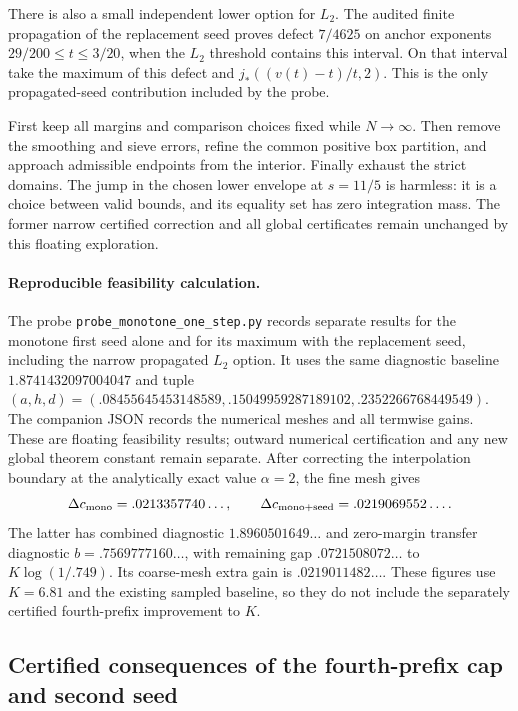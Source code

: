 \documentclass[11pt]{article}
\begin{document}
There is also a small independent lower option for $L_2$. The audited
finite propagation of the replacement seed proves defect $7/4625$
on anchor exponents $29/200\le t\le3/20$, when the $L_2$ threshold
contains this interval. On that interval take the maximum of this
defect and $j_*((v(t)-t)/t,2)$. This is the only propagated-seed
contribution included by the probe.

First keep all margins and comparison choices fixed while
$N\to\infty$. Then remove the smoothing and sieve errors, refine
the common positive box partition, and approach admissible endpoints
from the interior. Finally exhaust the strict domains. The jump in
the chosen lower envelope at $s=11/5$ is harmless: it is a choice
between valid bounds, and its equality set has zero integration mass.
The former narrow certified correction and all global certificates
remain unchanged by this floating exploration.

\paragraph{Reproducible feasibility calculation.}
The probe \texttt{probe\_monotone\_one\_step.py} records separate
results for the monotone first seed alone and for its maximum with
the replacement seed, including the narrow propagated $L_2$ option.
It uses the same diagnostic baseline $1.8741432097004047$ and tuple
$(a,h,d)=(.08455645453148589,.15049959287189102,.2352266768449549)$.
The companion JSON records the numerical meshes and all termwise
gains. These are floating feasibility results; outward numerical
certification and any new global theorem constant remain separate.
After correcting the interpolation boundary at the analytically
exact value $\alpha=2$, the fine mesh gives
\[
 \Delta c_{\rm mono}=.0213357740\ldots,\qquad
 \Delta c_{\rm mono+seed}=.0219069552\ldots .
\]
The latter has combined diagnostic $1.8960501649\ldots$ and
zero-margin transfer diagnostic $b=.7569777160\ldots$, with remaining
gap $.0721508072\ldots$ to $K\log(1/.749)$. Its coarse-mesh extra
gain is $.0219011482\ldots$. These figures use $K=6.81$ and the
existing sampled baseline, so they do not include the separately
certified fourth-prefix improvement to $K$.

\subsection{Certified consequences of the fourth-prefix cap and second seed}
\label{sec:fourth-prefix-second-seed-corollary}
\end{document}

